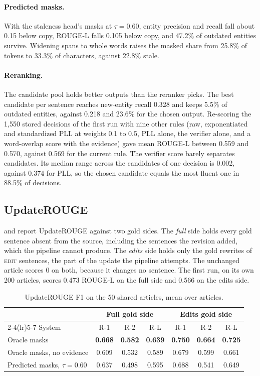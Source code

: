 \documentclass[]{paper}
\newcommand{\edit}{\textsc{edit}}
\begin{document}
\paragraph{Predicted masks.} With the staleness head's masks at $\tau = 0.60$, entity precision and recall fall about 0.15 below copy, ROUGE-L falls 0.105 below copy, and 47.2\% of outdated entities survive. Widening spans to whole words raises the masked share from 25.8\% of tokens to 33.3\% of characters, against 22.8\% stale.

\paragraph{Reranking.} The candidate pool holds better outputs than the reranker picks. The best candidate per sentence reaches new-entity recall 0.328 and keeps 5.5\% of outdated entities, against 0.218 and 23.6\% for the chosen output. Re-scoring the 1,550 stored decisions of the first run with nine other rules (raw, exponentiated and standardized PLL at weights 0.1 to 0.5, PLL alone, the verifier alone, and a word-overlap score with the evidence) gave mean ROUGE-L between 0.559 and 0.570, against 0.569 for the current rule. The verifier score barely separates candidates. Its median range across the candidates of one decision is 0.002, against 0.374 for PLL, so the chosen candidate equals the most fluent one in 88.5\% of decisions.

\subsection{UpdateROUGE}

 and  report UpdateROUGE against two gold sides. The \emph{full} side holds every gold sentence absent from the source, including the sentences the revision added, which the pipeline cannot produce. The \emph{edits} side holds only the gold rewrites of \edit{} sentences, the part of the update the pipeline attempts. The unchanged article scores 0 on both, because it changes no sentence. The first run, on its own 200 articles, scores 0.473 ROUGE-L on the full side and 0.566 on the edits side.

\begin{table}[t]
\caption{UpdateROUGE F1 on the 50 shared articles, mean over articles.}
\label{tab:update_rouge}
\centering
\small
\begin{tabular}{lcccccc}
\toprule
 & \multicolumn{3}{c}{Full gold side} & \multicolumn{3}{c}{Edits gold side} \\
\cmidrule(lr){2-4}\cmidrule(lr){5-7}
System & R-1 & R-2 & R-L & R-1 & R-2 & R-L \\
\midrule
Oracle masks & \textbf{0.668} & \textbf{0.582} & \textbf{0.639} & \textbf{0.750} & \textbf{0.664} & \textbf{0.725} \\
Oracle masks, no evidence & 0.609 & 0.532 & 0.589 & 0.679 & 0.599 & 0.661 \\
Predicted masks, $\tau = 0.60$ & 0.637 & 0.498 & 0.595 & 0.688 & 0.541 & 0.649 \\
\bottomrule
\end{tabular}
\end{table}
\end{document}
